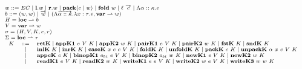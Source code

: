 \documentclass[fleqn]{article}
\begin{document}
\[
\scriptsize
\begin{array}{l}
w ::= EC \mid \mathbf{l}.w \mid \mathbf{r}.w \mid \mathbf{pack} \langle c \mid w \rangle \mid \mathbf{fold}~w \mid \ell~\overrightarrow{c} \mid \Lambda \alpha :: \kappa. e \\
b ::= (w,w) \mid \overrightarrow{w} \mid (\Lambda \overrightarrow{\alpha::\kappa}. \lambda x:\tau. e, \mathbf{var} \rightharpoonup w) \\
H = \mathbf{loc} \rightharpoonup b \\
V = \mathbf{var} \rightharpoonup w \\
\sigma = (H, V, K, e, r) \\
\Sigma = \mathbf{loc} \rightharpoonup \tau \\
\begin{array}{rcl}
K & ::= & \mathbf{retK} \mid \mathbf{appK1}~e~V~K \mid \mathbf{appK2}~w~K \mid \mathbf{pairK1}~e~V~K \mid \mathbf{pairK2}~w~K \mid \mathbf{fstK}~K \mid \mathbf{sndK}~K \\
& \mid & \mathbf{inlK}~K \mid \mathbf{inrK}~K \mid \mathbf{caseK}~x~e~e~V~K \mid \mathbf{foldK}~K \mid \mathbf{unfoldK}~K \mid \mathbf{packK}~c~K \mid \mathbf{unpackK}~\alpha~x~e~V~K \\
& \mid & \mathbf{appcK}~c~K \mid \mathbf{binopK1}~o_{bt}~e~V~K \mid \mathbf{binopK2}~o_{bt}~w~K \mid \mathbf{newK1}~e~V~K \mid \mathbf{newK2}~w~K \\
& \mid & \mathbf{readK1}~e~V~K \mid \mathbf{readK2}~w~K \mid \mathbf{writeK1}~e~e~V~K \mid \mathbf{writeK2}~w~e~V~K \mid \mathbf{writeK3}~w~w~K
\end{array} \\
\end{array}
\]
\end{document}
